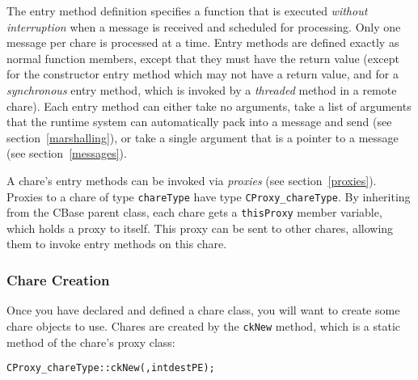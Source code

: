 The entry method definition specifies a function that is executed {\em without
interruption} when a message is received and scheduled for processing. Only one
message per chare is processed at a time.  Entry methods are defined exactly as
normal \CC{} function members, except that they must have the return value
 (except for the constructor entry method which may not have a return
value, and for a {\em synchronous} entry method, which is invoked by a {\em
threaded} method in a remote chare). Each entry method can either take no
arguments, take a list of arguments that the runtime system can automatically
pack into a message and send (see section~\ref{marshalling}), or take a single
argument that is a pointer to a \charmpp message (see section~\ref{messages}).

A chare's entry methods can be invoked via {\it proxies} (see
section~\ref{proxies}). Proxies to a chare of type {\tt chareType} have type
{\tt CProxy\_chareType}. By inheriting from the CBase parent class, each chare
gets a {\tt thisProxy} member variable, which holds a proxy to itself. This
proxy can be sent to other chares, allowing them to invoke entry methods on this
chare.


\subsubsection{Chare Creation}

\label{chare creation}

Once you have declared and defined a chare class, you will want to create some
chare objects to use. Chares are created by the {\tt ckNew} method, which is a
static method of the chare's proxy class:

\begin{alltt}
   CProxy_chareType::ckNew(, int destPE);
\end{alltt}

